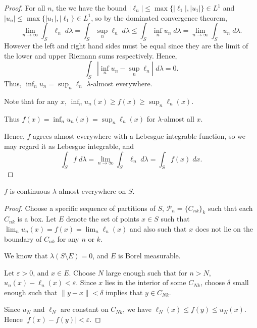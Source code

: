 \documentclass{unswmaths}
\begin{document}
\begin{proof}
    For all $n$, the we have the bound $|\ell_n| \leq \max\{|\ell_1|,|u_1|\} \in L^1$
    and $|u_n| \leq \max\{|u_1|,|\ell_1\} \in L^1$,    
    so by the dominated
    convergence theorem,
    \begin{equation*}
        \lim_{n\rightarrow\infty} \int_S \ell_n\;d\lambda = \int_S \sup_{n} \ell_n\;d\lambda \leq \int_S \inf_{n} u_n\;d\lambda = \lim_{n\rightarrow\infty}\int_Su_n\;d\lambda.
    \end{equation*}
    However the left and right hand sides must be equal since they are the limit of the lower and upper Riemann sums respectively. Hence,
    \begin{equation*}
        \int_S |\inf_n u_n-\sup_n \ell_n|\;d\lambda = 0.
    \end{equation*}
    Thus, $\inf_n u_n = \sup_n \ell_n$ $\lambda$-almost everywhere.
    
    Note that for any $x$, $\inf_n u_n(x) \geq f(x) \geq \sup_n \ell_n(x)$.
    
    Thus $f(x) = \inf_n u_n(x) = \sup_n \ell_n(x)$ for $\lambda$-almost all $x$.
    
    Hence, $f$ agrees almost everywhere with a Lebesgue integrable function, so we may
    regard it as Lebesgue integrable, and
    \begin{equation*}
        \int_S f\;d\lambda = \lim_{n\rightarrow\infty} \int_S \ell_n\;d\lambda = \int_S f(x)\;dx.
    \end{equation*}
    
\end{proof}

\begin{theorem}
    $f$ is continuous $\lambda$-almost everywhere on $S$.
\end{theorem}
\begin{proof}
    Choose a specific sequence of partitions of $S$, $\mathcal{P}_n = \{C_{nk}\}_k$
    such that each $C_{nk}$ is a box. Let $E$ denote the set of points
     $x \in S$ such that $\lim_n u_n(x) = f(x) = \lim_n \ell_n(x)$
     and also such that $x$ does not lie on the boundary of $C_{nk}$ for any $n$ or $k$.
     
     We know that $\lambda(S\setminus E) = 0$, and $E$ is Borel measurable.
     
    Let $\varepsilon > 0$, and $x \in E$. Choose $N$ large enough such that for $n > N$,
    $u_n(x) -\ell_n(x) < \varepsilon$. Since $x$ lies in the interior of some $C_{Nk}$, choose $\delta$
    small enough such that $\|y-x\| < \delta$ implies that $y \in C_{Nk}$.
    
    Since $u_N$ and $\ell_N$ are constant on $C_{Nk}$, we have $\ell_N(x) \leq f(y) \leq u_N(x)$. 
    Hence $|f(x)-f(y)| < \varepsilon$.
\end{proof}
\end{document}
